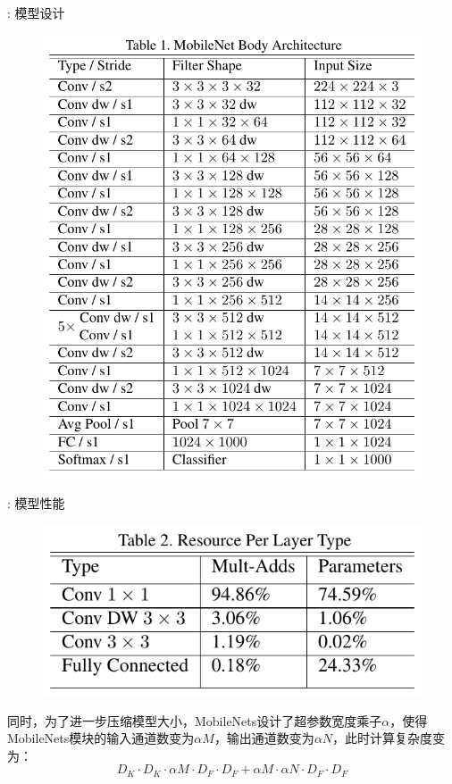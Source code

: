 \documentclass[UTF8, fontset=founder, aspectratio=43, 10pt, t]{ctexbeamer}
\begin{document}
\begin{frame}{\titleprefix: 模型设计}
	\begin{figure}
		\centering
		\includegraphics[width=0.5\linewidth]{Images/mobilenet}
		\label{fig:mobilenet}
	\end{figure}
\end{frame}

\begin{frame}{\titleprefix: 模型性能}
	\begin{figure}
		\centering
		\includegraphics[width=0.7\linewidth]{Images/mobilenetres}
		\label{fig:mobilenetres}
	\end{figure}

	同时，为了进一步压缩模型大小，MobileNets设计了超参数\alert{宽度乘子}$\alpha$，使得MobileNets模块的输入通道数变为$\alpha M$，输出通道数变为$\alpha N$，此时计算复杂度变为：
	$$
	D_{K} \cdot D_{K} \cdot \alpha M \cdot D_{F} \cdot D_{F}+\alpha M \cdot \alpha N \cdot D_{F} \cdot D_{F}
	$$
	
\end{frame}
\end{document}
